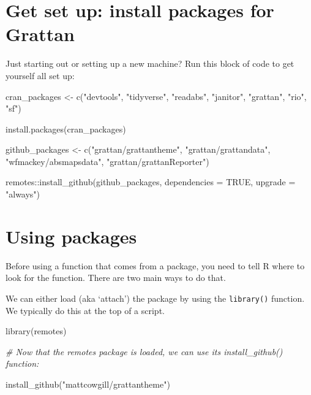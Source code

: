 \documentclass[
]{book}
\newenvironment{Shaded}{\begin{snugshade}}{\end{snugshade}}
\newcommand{\AttributeTok}[1]{\textcolor[rgb]{0.77,0.63,0.00}{#1}}
\newcommand{\CommentTok}[1]{\textcolor[rgb]{0.56,0.35,0.01}{\textit{#1}}}
\newcommand{\ConstantTok}[1]{\textcolor[rgb]{0.00,0.00,0.00}{#1}}
\newcommand{\FunctionTok}[1]{\textcolor[rgb]{0.00,0.00,0.00}{#1}}
\newcommand{\NormalTok}[1]{#1}
\newcommand{\OtherTok}[1]{\textcolor[rgb]{0.56,0.35,0.01}{#1}}
\newcommand{\SpecialCharTok}[1]{\textcolor[rgb]{0.00,0.00,0.00}{#1}}
\newcommand{\StringTok}[1]{\textcolor[rgb]{0.31,0.60,0.02}{#1}}
\begin{document}
\hypertarget{install-grattan-packages}{%
\section{Get set up: install packages for Grattan}\label{install-grattan-packages}}

Just starting out or setting up a new machine? Run this block of code to get yourself all set up:

\begin{Shaded}
\begin{Highlighting}[]
\NormalTok{cran\_packages }\OtherTok{\textless{}{-}} \FunctionTok{c}\NormalTok{(}\StringTok{"devtools"}\NormalTok{, }\StringTok{"tidyverse"}\NormalTok{, }\StringTok{"readabs"}\NormalTok{, }\StringTok{"janitor"}\NormalTok{, }\StringTok{"grattan"}\NormalTok{,}
                   \StringTok{"rio"}\NormalTok{, }\StringTok{"sf"}\NormalTok{)}

\FunctionTok{install.packages}\NormalTok{(cran\_packages)}

\NormalTok{github\_packages }\OtherTok{\textless{}{-}} \FunctionTok{c}\NormalTok{(}\StringTok{"grattan/grattantheme"}\NormalTok{, }\StringTok{"grattan/grattandata"}\NormalTok{,}
                     \StringTok{"wfmackey/absmapsdata"}\NormalTok{, }\StringTok{"grattan/grattanReporter"}\NormalTok{)}

\NormalTok{remotes}\SpecialCharTok{::}\FunctionTok{install\_github}\NormalTok{(github\_packages,}
                        \AttributeTok{dependencies =} \ConstantTok{TRUE}\NormalTok{,}
                        \AttributeTok{upgrade =} \StringTok{"always"}\NormalTok{)}
\end{Highlighting}
\end{Shaded}

\hypertarget{using-packages}{%
\section{Using packages}\label{using-packages}}

Before using a function that comes from a package, you need to tell R where to look for the function. There are two main ways to do that.

We can either load (aka `attach') the package by using the \texttt{library()} function. We typically do this at the top of a script.

\begin{Shaded}
\begin{Highlighting}[]
\FunctionTok{library}\NormalTok{(remotes)}

\CommentTok{\# Now that the \textasciigrave{}remotes\textasciigrave{} package is loaded, we can use its \textasciigrave{}install\_github()\textasciigrave{} function:}

\FunctionTok{install\_github}\NormalTok{(}\StringTok{"mattcowgill/grattantheme"}\NormalTok{)}
\end{Highlighting}
\end{Shaded}
\end{document}
